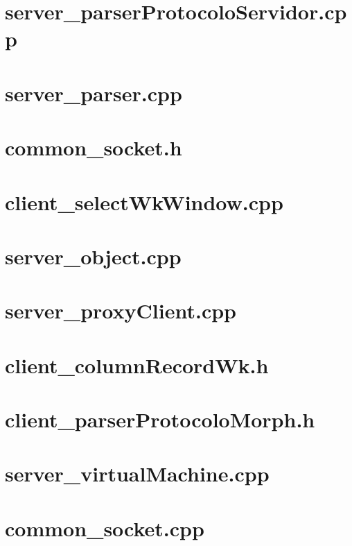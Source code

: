 \documentclass{article}
\begin{document}
\section{ server\_parserProtocoloServidor.cpp }

\newpage
\section{ server\_parser.cpp }

\newpage
\section{ common\_socket.h }

\newpage
\section{ client\_selectWkWindow.cpp }

\newpage
\section{ server\_object.cpp }

\newpage
\section{ server\_proxyClient.cpp }

\newpage
\section{ client\_columnRecordWk.h }

\newpage
\section{ client\_parserProtocoloMorph.h }

\newpage
\section{ server\_virtualMachine.cpp }

\newpage
\section{ common\_socket.cpp }

\newpage
\end{document}
